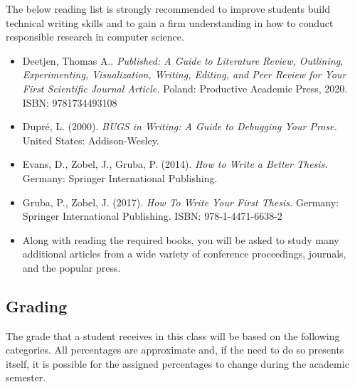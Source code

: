 \documentclass[11pt]{article} %
\begin{document}
The below reading list is strongly recommended to improve students build technical writing skills and to gain a firm understanding in how to conduct responsible research in computer science.


\begin{itemize}

\item Deetjen, Thomas A.. {\em Published: A Guide to Literature Review, Outlining, Experimenting, Visualization, Writing, Editing, and Peer Review for Your First Scientific Journal Article.} Poland: Productive Academic Press, 2020.  ISBN: 9781734493108

\item Dupré, L. (2000). {\em  BUGS in Writing: A Guide to Debugging Your Prose.} United States: Addison-Wesley. 


\item Evans, D., Zobel, J., Gruba, P. (2014). {\em How to Write a Better Thesis.} Germany: Springer International Publishing.

\item Gruba, P., Zobel, J. (2017). {\em How To Write Your First Thesis.} Germany: Springer International Publishing. ISBN: 978-1-4471-6638-2


\item Along with reading the required books, you will be asked to study many additional articles from a wide variety of conference proceedings, journals, and the popular press.
\end{itemize}






\subsection*{\textbf{Grading}}

The grade that a student receives in this class will be based on the following categories. All percentages are approximate and, if the need to do so presents itself, it is possible for the assigned percentages to change during the academic semester. 
\color{red}
\end{document}
